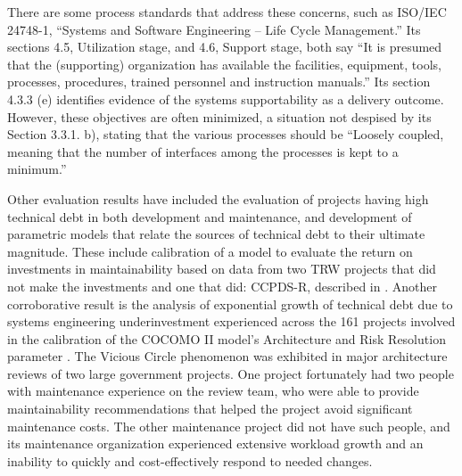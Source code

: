 There are some process standards that address these concerns, such as ISO/IEC 24748-1, “Systems and Software Engineering – Life Cycle Management.” Its sections 4.5, Utilization stage, and 4.6, Support stage, both say “It is presumed that the (supporting) organization has available the facilities, equipment, tools, processes, procedures, trained personnel and instruction manuals.” Its section 4.3.3 (e) identifies evidence of the systems supportability as a delivery outcome. However, these objectives are often minimized, a situation not despised by its Section 3.3.1. b), stating that the various processes should be “Loosely coupled, meaning that the number of interfaces among the processes is kept to a minimum.”
\cite{ISOICETR247481}


Other evaluation results have included the evaluation of projects 
having high technical debt in both development and maintenance, and development of parametric models that relate the sources of technical debt to their ultimate magnitude. These include calibration of a model to evaluate the return on investments in maintainability based on data from two TRW projects that did not make the investments and one that did: CCPDS-R, described in \cite{royce1998software}. Another corroborative result is the analysis of exponential growth of technical debt due to systems engineering underinvestment experienced across the 161 projects involved in the calibration of the COCOMO II model's Architecture and Risk Resolution parameter \cite{boehm2000software}. The Vicious Circle phenomenon was exhibited in major architecture reviews of two large government projects. One project fortunately had two people with maintenance experience on the review team, who were able to provide maintainability recommendations that helped the project avoid significant maintenance costs. The other maintenance project did not have such people, and its maintenance organization experienced extensive workload growth and an inability to quickly and cost-effectively respond to needed changes. 

